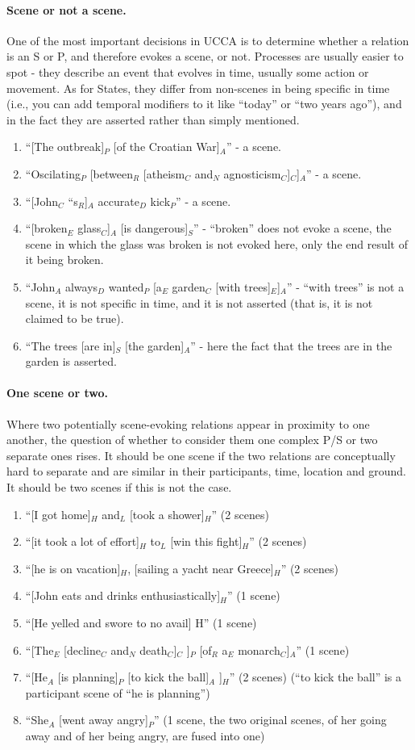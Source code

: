 \documentclass[11pt]{article}
\newcommand{\be}{\begin{enumerate}}
\newcommand{\ee}{\end{enumerate}}
\begin{document}
\paragraph{
Scene or not a scene.} One of the most important decisions in UCCA is to determine whether a relation is an S or P, and therefore evokes a scene, or not. Processes are usually easier to spot - they describe an event that evolves in time, usually some action or movement. As for States, they differ from non-scenes in being specific in time (i.e., you can add temporal modifiers to it like ``today'' or ``two years ago''), and in the fact they are asserted rather than simply mentioned.
\be
\item
``[The outbreak]$_P$ [of the Croatian War]$_A$'' - a scene.
\item
``Oscilating$_P$ [between$_R$ [atheism$_C$ and$_N$ agnosticism$_C$]$_C$]$_A$'' - a scene.
\item
``[John$_C$ ``s$_R$]$_A$ accurate$_D$ kick$_P$'' - a scene.
\item
``[broken$_E$ glass$_C$]$_A$ [is dangerous]$_S$'' - ``broken'' does not evoke a scene, the scene in which the glass was broken is not evoked here, only the end result of it being broken.
\item
``John$_A$ always$_D$ wanted$_P$ [a$_E$ garden$_C$ [with trees]$_E$]$_A$'' - ``with trees'' is not a scene, it is not specific in time, and it is not asserted (that is, it is not claimed to be true).
\item
``The trees [are in]$_S$ [the garden]$_A$'' - here the fact that the trees are in the garden is asserted.
\ee

\paragraph{
One scene or two.} Where two potentially scene-evoking relations appear in proximity to one another, the question of whether to consider them one complex P/S or two separate ones rises. It should be one scene if the two relations are conceptually hard to separate and are similar in their participants, time, location and ground. It should be two scenes if this is not the case.
\be
\item
``[I got home]$_H$ and$_L$ [took a shower]$_H$'' (2 scenes)
\item
``[it took a lot of effort]$_H$ to$_L$ [win this fight]$_H$'' (2 scenes)
\item
``[he is on vacation]$_H$, [sailing a yacht near Greece]$_H$'' (2 scenes)
\item
``[John eats and drinks enthusiastically]$_H$'' (1 scene)
\item
``[He yelled and swore to no avail] H'' (1 scene)
\item
``[The$_E$ [decline$_C$ and$_N$ death$_C$]$_C$ ]$_P$ [of$_R$ a$_E$ monarch$_C$]$_A$'' (1 scene)
\item
``[He$_A$ [is planning]$_P$ [to kick the ball]$_A$ ]$_H$'' (2 scenes) (``to kick the ball'' is a participant scene of ``he is planning'')
\item
``She$_A$ [went away angry]$_P$'' (1 scene, the two original scenes, of her going away and of her being angry, are fused into one)
\ee
\end{document}
